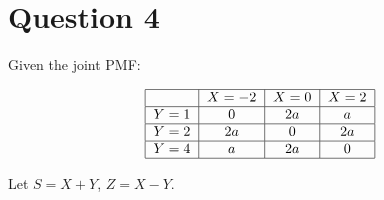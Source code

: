 \documentclass[12pt]{article}
\begin{document}
	
	\section*{Question 4}
	
	\noindent Given the joint PMF:
	
	\bigskip
	
	\[
	\begin{tabular}{|c|c|c|c|}
		\hline
		$     $ & $X = -2$ & $X = 0$ & $X = 2$ \\ \hline
		$Y = 1$ & $0$      & $2a   $ & $a    $ \\ \hline
		$Y = 2$ & $2a$     & $0    $ & $2a   $ \\ \hline
		$Y = 4$ & $a$      & $2a   $ & $0    $ \\ \hline
	\end{tabular}
	\]
	
	\bigskip
	
	\noindent Let $S = X + Y$, $Z = X - Y$.
	
	\bigskip
	
\end{document}

